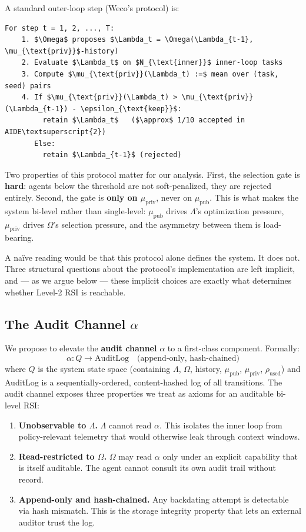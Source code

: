 \documentclass{article}
\theoremstyle{definition}
\begin{document}
A standard outer-loop step (Weco's protocol) is:

\begin{verbatim}
For step t = 1, 2, ..., T:
    1. $\Omega$ proposes $\Lambda_t = \Omega(\Lambda_{t-1}, \mu_{\text{priv}}$-history)
    2. Evaluate $\Lambda_t$ on $N_{\text{inner}}$ inner-loop tasks
    3. Compute $\mu_{\text{priv}}(\Lambda_t) :=$ mean over (task, seed) pairs
    4. If $\mu_{\text{priv}}(\Lambda_t) > \mu_{\text{priv}}(\Lambda_{t-1}) - \epsilon_{\text{keep}}$:
         retain $\Lambda_t$   ($\approx$ 1/10 accepted in AIDE\textsuperscript{2})
       Else:
         retain $\Lambda_{t-1}$ (rejected)
\end{verbatim}

Two properties of this protocol matter for our analysis. First, the selection gate is \textbf{hard}: agents below the threshold are not soft-penalized, they are rejected entirely. Second, the gate is \textbf{only on $\mu_{\text{priv}}$}, never on $\mu_{\text{pub}}$. This is what makes the system bi-level rather than single-level: $\mu_{\text{pub}}$ drives $\Lambda$'s optimization pressure, $\mu_{\text{priv}}$ drives $\Omega$'s selection pressure, and the asymmetry between them is load-bearing.

A na\"ive reading would be that this protocol alone defines the system. It does not. Three structural questions about the protocol's implementation are left implicit, and --- as we argue below --- these implicit choices are exactly what determines whether Level-2 RSI is reachable.

\subsection{The Audit Channel $\alpha$}

We propose to elevate the \textbf{audit channel} $\alpha$ to a first-class component. Formally:
\[
\alpha : Q \to \text{AuditLog} \quad \text{(append-only, hash-chained)}
\]
where $Q$ is the system state space (containing $\Lambda$, $\Omega$, history, $\mu_{\text{pub}}$, $\mu_{\text{priv}}$, $\rho_{\text{used}}$) and AuditLog is a sequentially-ordered, content-hashed log of all transitions. The audit channel exposes three properties we treat as axioms for an auditable bi-level RSI:

\begin{enumerate}
    \item \textbf{Unobservable to $\Lambda$.} $\Lambda$ cannot read $\alpha$. This isolates the inner loop from policy-relevant telemetry that would otherwise leak through context windows.
    \item \textbf{Read-restricted to $\Omega$.} $\Omega$ may read $\alpha$ only under an explicit capability that is itself auditable. The agent cannot consult its own audit trail without record.
    \item \textbf{Append-only and hash-chained.} Any backdating attempt is detectable via hash mismatch. This is the storage integrity property that lets an external auditor trust the log.
\end{enumerate}
\end{document}
